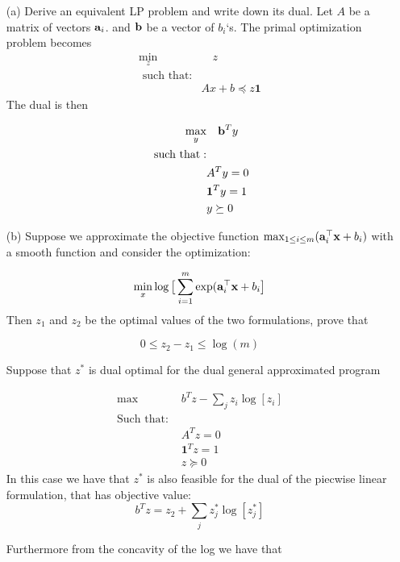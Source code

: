 \documentclass{article} %
\newcommand{\B}[1]{\mathbf{#1}}
\renewcommand\a{{\bf a}}
\renewcommand\b{{\bf b}}
\newcommand\x{{\bf x}}
\renewcommand\a{{\bf a}}
\renewcommand\b{{\bf b}}
\begin{document}
\begin{itemize}
\item[(a)] Derive an equivalent LP problem and write down its dual. 
Let $A$ be a matrix of vectors $\a_i$. and $\b$ be a vector of $b_i$`s. The primal optimization problem becomes 
\begin{equation*}
\begin{aligned}
\min_{z} & \quad  z \\ 
\mbox{ such that}: & \\ 
& Ax + b \preceq z \B{1}
\end{aligned}
\end{equation*}
The dual is then 

\begin{equation*}
\begin{aligned}
\max_{y} & \quad  \b^{T} y \\ 
\mbox{ such that}: & \\ 
& A^T y = 0 \\ 
& \B{1}^{T}y = 1\\ 
& y  \succeq 0
\end{aligned}
\end{equation*}
\item[(b)]Suppose we approximate the objective function $\max_{1\leq i \leq m}(\a_i^{\top} \x + b_i)$ with a smooth function and consider the optimization:

\[
\min_{x} \log\big[ \sum_{i=1}^{m} \exp(\a_i^{\top} \x + b_i \big]
\]
Then $z_1$ and $z_2$ be the optimal values of the two formulations, prove that 

\[
0 \leq z_2 - z_1 \leq \log(m)
\]


Suppose that $z^{*}$ is  dual optimal for the dual general approximated program

\begin{equation*}
\begin{aligned}
\max \quad & b^T z - \sum_{j}z_i \log[z_i] \\ 
\mbox{Such that: } & \\ 
& A^T  z = 0 \\ 
& \B{1}^{T}z = 1\\ 
& z \succeq 0
\end{aligned}
\end{equation*}
In this case we have that $z^*$ is also feasible for the dual of the piecwise linear formulation, that has objective value:
\[
b^T z = z_2 + \sum_{j} z_j^{*} \log[z_j^{*}]
\]

Furthermore from the concavity of the log we have that 


\end{itemize}
\end{document}
